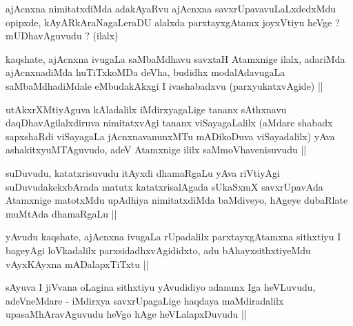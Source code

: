 
\begin{artha}
ajAcnxna nimitatxdiMda adakAyaRvu ajAcnxna savxrUpavavuLaLxdedxMdu
opipxde, kAyARkAraNagaLeraDU alalxda parxtayxgAtamx joyxVtiyu heVge ?
mUDhavAguvudu ? (ilalx)
\end{artha}

\begin{artha}
kaqshate, ajAcnxna ivugaLa saMbaMdhavu savxtaH Atamxnige ilalx,
adariMda ajAcnxnadiMda huTiTxkoMDa deVha, budidhx modalAdavugaLa
saMbaMdhadiMdale eMbudakAkxgi I ivashabadxvu (parxyukatxvAgide) ||
\end{artha}


\begin{artha}
utAkxrXMtiyAguva kAladalilx iMdirxyagaLige tananx sAthxnavu
daqDhavAgilalxdiruva nimitatxvAgi tananx viSayagaLalilx (aMdare
shabadx sapxshaRdi viSayagaLa jAcnxnavanunxMTu mADikoDuva
viSayadalilx) yAva ashakitxyuMTAguvudo, adeV Atamxnige ililx
saMmoVhavenisuvudu ||
\end{artha}


\begin{artha}
suDuvudu, katatxrisuvudu itAyxdi dhamaRgaLu yAva riVtiyAgi
suDuvudakekxbArada matutx katatxrisalAgada sUkaSxmX savxrUpavAda
Atamxnige matotxMdu upAdhiya nimitatxdiMda baMdiveyo, hAgeye dubaRlate
muMtAda dhamaRgaLu ||
\end{artha}


\begin{artha}
yAvudu kaqshate, ajAcnxna ivugaLa rUpadalilx parxtayxgAtamxna
sithxtiyu I bageyAgi loVkadalilx parxsidadhxvAgididxto, adu
bAhayxsithxtiyeMdu vAyxKAyxna mADalapxTiTxtu ||
\end{artha}


\begin{artha}
sAyuva I jiVvana oLagina sithxtiyu yAvudidiyo adanunx Iga heVLuvudu,
adeVneMdare - iMdirxya savxrUpagaLige haqdaya maMdiradalilx
upasaMhAravAguvudu heVgo hAge heVLalapxDuvudu ||
\end{artha}


